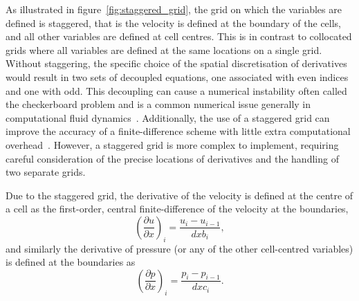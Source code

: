 As illustrated in figure~\ref{fig:staggered_grid}, the grid on which the variables are defined is staggered, that is the velocity is defined at the boundary of the cells, and all other variables are defined at cell centres. This is in contrast to collocated grids where all variables are defined at the same locations on a single grid. Without staggering, the specific choice of the spatial discretisation of derivatives would result in two sets of decoupled equations, one associated with even indices and one with odd. This decoupling can cause a numerical instability often called the checkerboard problem and is a common numerical issue generally in computational fluid dynamics~\cite{ferzigerComputationalMethodsFluid2002}. Additionally, the use of a staggered grid can improve the accuracy of a finite-difference scheme with little extra computational overhead~\cite{rojanaratanangkulePerformanceHighOrder2015}. However, a staggered grid is more complex to implement, requiring careful consideration of the precise locations of derivatives and the handling of two separate grids. 

Due to the staggered grid, the derivative of the velocity is defined at the centre of a cell as the first-order, central finite-difference of the velocity at the boundaries,
\begin{equation}
  {\left( \frac{\partial u}{\partial x} \right)}_i = \frac{u_i - u_{i-1}}{dxb_i},
  \label{}
\end{equation}
and similarly the derivative of pressure (or any of the other cell-centred variables) is defined at the boundaries as
\begin{equation}
  {\left( \frac{\partial p}{\partial x} \right)}_i = \frac{p_i - p_{i-1}}{dxc_i}.
  \label{}
\end{equation}

